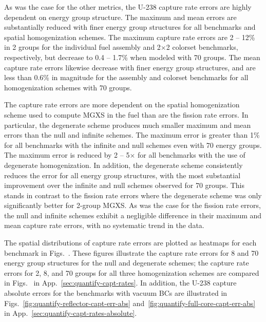 As was the case for the other metrics, the U-238 capture rate errors are highly dependent on energy group structure. The maximum and mean errors are substantially reduced with finer energy group structures for all benchmarks and spatial homogenization schemes. The maximum capture rate errors are 2 -- 12\% in 2 groups for the individual fuel assembly and 2$\times$2 colorset benchmarks, respectively, but decrease to 0.4 -- 1.7\% when modeled with 70 groups. The mean capture rate errors likewise decrease with finer energy group structures, and are less than 0.6\% in magnitude for the assembly and colorset benchmarks for all homogenization schemes with 70 groups.

The capture rate errors are more dependent on the spatial homogenization scheme used to compute \ac{MGXS} in the fuel than are the fission rate errors. In particular, the degenerate scheme produces much smaller maximum and mean errors than the null and infinite schemes. The maximum error is greater than 1\% for all benchmarks with the infinite and null schemes even with 70 energy groups. The maximum error is reduced by 2 -- 5$\times$ for all benchmarks with the use of degenerate homogenization. In addition, the degenerate scheme consistently reduces the error for all energy group structures, with the most substantial improvement over the infinite and null schemes observed for 70 groups. This stands in contrast to the fission rate errors where the degenerate scheme was only significantly better for 2-group \ac{MGXS}. As was the case for the fission rate errors, the null and infinite schemes exhibit a negligible difference in their maximum and mean capture rate errors, with no systematic trend in the data.

The spatial distributions of capture rate errors are plotted as heatmaps for each benchmark in Figs.~. These figures illustrate the capture rate errors for 8 and 70 energy group structures for the null and degenerate schemes; the capture rate errors for 2, 8, and 70 groups for all three homogenization schemes are compared in Figs.~ in App.~\ref{sec:quantify-capt-rates}. In addition, the U-238 capture absolute errors for the benchmarks with vacuum \acp{BC} are illustrated in Figs.~\ref{fig:quantify-reflector-capt-err-abs} and~\ref{fig:quantify-full-core-capt-err-abs} in App.~\ref{sec:quantify-capt-rates-absolute}.

